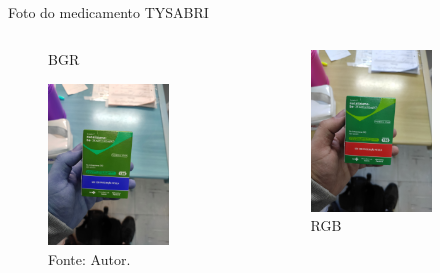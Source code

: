 \begin{frame}{Foto do medicamento TYSABRI\textsuperscript{\small\textregistered}}
	\begin{columns}
		\begin{column}{0.5\textwidth}
			\begin{figure}
				\caption*{BGR}
				\includegraphics[width=0.75\textwidth]{../pictures/tysabri_bgr.jpg}
				\caption*{Fonte: Autor.}
			\end{figure}
		\end{column}
		\begin{column}{0.5\textwidth}
			\begin{figure}
				\caption*{RGB}
				\includegraphics[width=0.75\textwidth]{../pictures/tysabri_rgb.jpg}

\end{figure}
\end{column}
\end{columns}
\end{frame}
